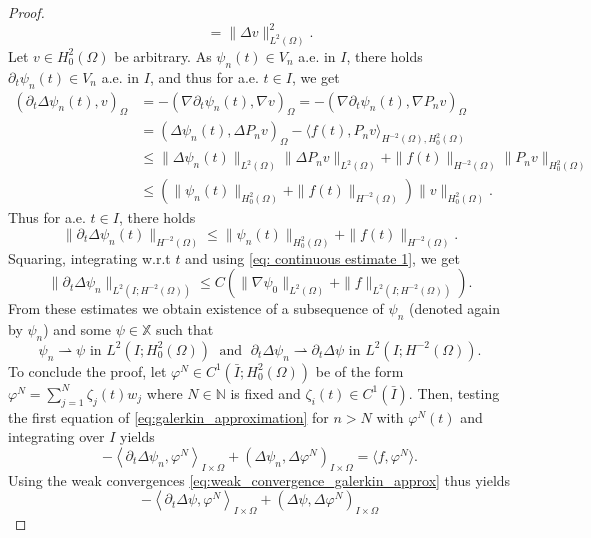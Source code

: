 \documentclass{m2an}
\newcommand{\1}{\mathds{1}}
\newcommand{\N}{\mathbb{N}}
\newcommand{\Om}{\Omega}
\newcommand{\IOprod}[1]{\left( #1 \right)_{I\times \Omega}}
\newcommand{\IOpair}[1]{\left\langle #1 \right\rangle_{I\times \Omega}}
\newcommand{\na}{\nabla}
\newcommand{\IOm}{I\times \Om}
\newcommand{\XX}{\mathbb{X}}
\theoremstyle{definition}
\begin{document}
\begin{proof}
\[= \|\Delta v\|^2_{L^2(\Omega)}.
\]
Let $v \in H^2_0(\Omega)$ be arbitrary. As $\psi_n(t) \in V_n$ a.e. in $I$, there holds 
$\partial_t \psi_n(t) \in V_n$ a.e. in $I$, and thus for a.e. $t \in I$, we get
\[
\begin{aligned}
(\partial_t \Delta \psi_n(t),v)_\Omega &= -(\nabla \partial_t \psi_n(t),\nabla v)_\Omega = -(\nabla \partial_t \psi_n(t),\nabla P_n v)_\Omega\\
&= (\Delta \psi_n(t),\Delta P_n v)_\Omega - \langle f(t), P_n v \rangle_{H^{-2}(\Omega),H^2_0(\Omega)}\\
&\le \|\Delta \psi_n(t)\|_{L^2(\Omega)} \|\Delta P_n v\|_{L^2(\Omega)} 
+ \|f(t)\|_{H^{-2}(\Om)} \|P_n v\|_{H^2_0(\Om)}\\
& \le \left(\|\psi_n(t)\|_{H^2_0(\Omega)} + \|f(t)\|_{H^{-2}(\Om)} \right) \|v\|_{H^2_0(\Omega)}.
\end{aligned}
\]
Thus for a.e. $t \in I$, there holds
\[
\|\partial_t \Delta \psi_n(t)\|_{H^{-2}(\Omega)} \le \|\psi_n(t)\|_{H^2_0(\Omega)} + \|f(t)\|_{H^{-2}(\Om)}.
\]
Squaring, integrating w.r.t $t$ and using \eqref{eq: continuous estimate 1}, we get
\begin{equation}\label{eq:galerkin_approx_bound_dt}
    \|\partial_t \Delta \psi_n\|_{L^2(I;H^{-2}(\Omega))} 
    \le  C\left(\|\na \psi_0\|_{L^2(\Om)} +\|f\|_{L^2(I;H^{-2}(\Om))}\right).
\end{equation}
From these estimates we obtain existence of a subsequence of $\psi_n$ (denoted again by $\psi_n$) and some $\psi \in \XX$ such that
\begin{equation}\label{eq:weak_convergence_galerkin_approx}
\psi_n \rightharpoonup \psi \text{ in } L^2(I;H^2_0(\Omega)) \;\text{ and }\; \partial_t \Delta \psi_n \rightharpoonup \partial_t \Delta \psi \text{ in } L^2(I;H^{-2}(\Omega)).
\end{equation}
To conclude the proof, let $\varphi^N \in C^1(\bar I;H^2_0(\Om))$ be of the form 
$\varphi^N = \sum_{j=1}^N \zeta_j(t)w_j$ where $N \in \N$ is fixed and $\zeta_i(t)\in C^1(\bar{I})$.
Then, testing the first equation of \eqref{eq:galerkin_approximation} for $n > N$
with $\varphi^N(t)$ and integrating over $I$ yields
\[
    -\IOpair{\partial_t \Delta \psi_n, \varphi^N}+\IOprod{\Delta \psi_n, \Delta \varphi^N}
        = \langle f, \varphi^N \rangle.
\]
Using the weak convergences \eqref{eq:weak_convergence_galerkin_approx} thus yields
\[
    -\IOpair{\partial_t \Delta \psi, \varphi^N}+\IOprod{\Delta \psi, \Delta \varphi^N}
\]
\end{proof}
\end{document}
